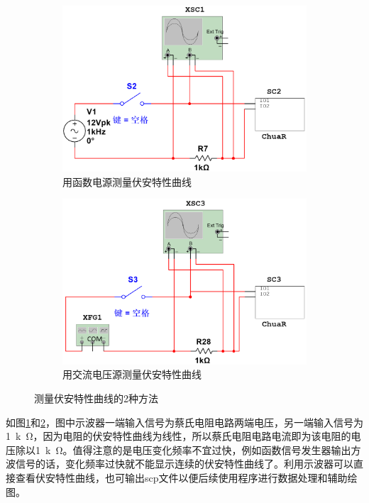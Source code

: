 \documentclass{article}
\begin{document}
\begin{figure}[htbp]
	\centering
	\begin{subfigure}[htbp]{.45\linewidth}
		\centering
		\includegraphics[width=\linewidth]{ChuaR2.png}
		\caption{用函数电源测量伏安特性曲线}
		\label{fig:用函数电源测量伏安特性曲线}
	\end{subfigure}
	\quad
	\begin{subfigure}[htbp]{.45\linewidth}
		\centering
		\includegraphics[width=\linewidth]{ChuaR3.png}
		\caption{用交流电压源测量伏安特性曲线}
		\label{fig:用交流电压源测量伏安特性曲线}
	\end{subfigure}
	\caption{测量伏安特性曲线的2种方法}
	\label{fig:测量伏安特性曲线的2种方法}
\end{figure}

如图\ref{fig:用函数电源测量伏安特性曲线}和\ref{fig:用交流电压源测量伏安特性曲线}，图中示波器一端输入信号为蔡氏电阻电路两端电压，另一端输入信号为\SI{1}{k\ohm}，因为电阻的伏安特性曲线为线性，所以蔡氏电阻电路电流即为该电阻的电压除以\SI{1}{k\ohm}。值得注意的是电压变化频率不宜过快，例如函数信号发生器输出方波信号的话，变化频率过快就不能显示连续的伏安特性曲线了。利用示波器可以直接查看伏安特性曲线，也可输出scp文件以便后续使用程序进行数据处理和辅助绘图。
\end{document}

